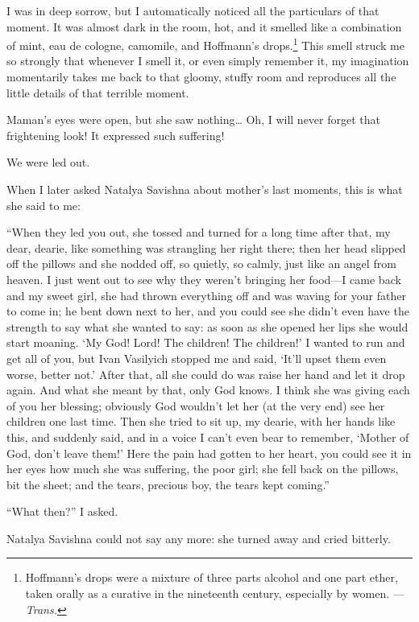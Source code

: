 I was in deep sorrow, but I automatically noticed all the particulars of that moment. It was almost dark in the room, hot, and it smelled like a combination of mint, eau de cologne, camomile, and Hoffmann's drops.\footnote{Hoffmann's drops were a mixture of three parts alcohol and one part ether, taken orally as a curative in the nineteenth century, especially by women. --- \textit{Trans.}} This smell struck me so strongly that whenever I smell it, or even simply remember it, my imagination momentarily takes me back to that gloomy, stuffy room and reproduces all the little details of that terrible moment.

Maman's eyes were open, but she saw nothing\ldots{} Oh, I will never forget that frightening look! It expressed such suffering!

We were led out.

When I later asked Natalya Savishna about mother's last moments, this is what she said to me:

``When they led you out, she tossed and turned for a long time after that, my dear, dearie, like something was strangling her right there; then her head slipped off the pillows and she nodded off, so quietly, so calmly, just like an angel from heaven. I just went out to see why they weren't bringing her food---I came back and my sweet girl, she had thrown everything off and was waving for your father to come in; he bent down next to her, and you could see she didn't even have the strength to say what she wanted to say: as soon as she opened her lips she would start moaning. `My God! Lord! The children! The children!' I wanted to run and get all of you, but Ivan Vasilyich stopped me and said, `It'll upset them even worse, better not.' After that, all she could do was raise her hand and let it drop again. And what she meant by that, only God knows. I think she was giving each of you her blessing; obviously God wouldn't let her (at the very end) see her children one last time. Then she tried to sit up, my dearie, with her hands like this, and suddenly said, and in a voice I can't even bear to remember, `Mother of God, don't leave them!' Here the pain had gotten to her heart, you could see it in her eyes how much she was suffering, the poor girl; she fell back on the pillows, bit the sheet; and the tears, precious boy, the tears kept coming.'' %

``What then?'' I asked.

Natalya Savishna could not say any more: she turned away and cried bitterly.

